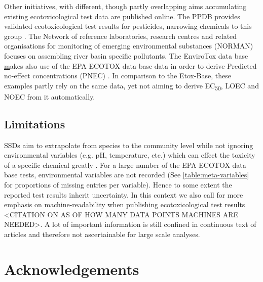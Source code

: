 \documentclass[english]{article}
\newcommand{\etoxbase}{Etox-Base}
\newcommand{\epa}{EPA ECOTOX data base}
\newcommand{\ecfifty}{EC\textsubscript{50}}
\begin{document}
Other initiatives, with different, though partly overlapping aims accumulating existing ecotoxicological test data are published online. The PPDB provides validated ecotoxicological test results for pesticides, narrowing chemicals to this group \citep{lewis_international_2016}. The Network of reference laboratories, research centres and related organisations for monitoring of emerging environmental substances (NORMAN) focuses on assembling river basin specific pollutants\citep{von_der_ohe_new_2011}. The EnviroTox data base \href{https://envirotoxdatabase.org/} makes also use of the \epa{} data in order to derive Predicted no-effect concentrations (PNEC) \citep{health_and_environmental_sciences_institute_hesi_envirotox_2019}. In comparison to the \etoxbase, these examples partly rely on the same data, yet not aiming to derive \ecfifty, LOEC and NOEC from it automatically.






\subsection*{Limitations}

SSDs aim to extrapolate from species to the community level while not ignoring environmental variables (e.g. pH, temperature, etc.) which can effect the toxicity of a specific chemical greatly \citep{posthuma_species_2002}. For a large number of the \epa{} tests, environmental variables are not recorded (See \ref{table:meta-variables} for proportions of missing entries per variable). Hence to some extent the reported test results inherit uncertainty. In this context we also call for more emphasis on machine-readability when publishing ecotoxicological test results <CITATION ON AS OF HOW MANY DATA POINTS MACHINES ARE NEEDED>. A lot of important information is still confined in continuous text of articles and therefore not ascertainable for large scale analyses.














\section*{Acknowledgements}
\end{document}
